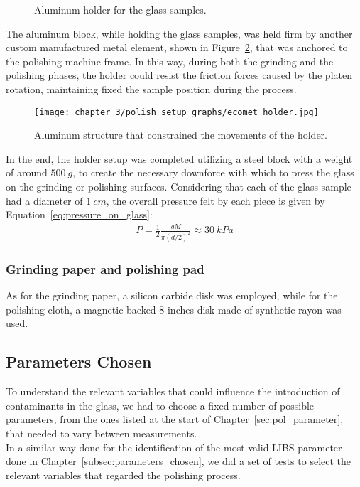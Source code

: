 \begin{figure}[H]
    \centering
    \quad
    \caption{Aluminum holder for the glass samples. }
    \label{fig:holder}
\end{figure}
The aluminum block, while holding the glass samples, was held firm by another custom manufactured metal element, shown in Figure~\ref{fig:aluminum_structure}, that was anchored to the polishing machine frame. In this way, during both the grinding and the polishing phases, the holder could resist the friction forces caused by the 
platen rotation, maintaining fixed the sample position during the process.
\begin{figure}[H]
    \centering
    \texttt{[image: chapter\_3/polish\_setup\_graphs/ecomet\_holder.jpg]} 
    \caption{Aluminum structure that constrained the movements of the holder.}
    \label{fig:aluminum_structure}
\end{figure}
In the end, the holder setup was completed utilizing a steel block with a weight of around $500\: g$, to create the necessary downforce with which to press the glass on the grinding or polishing surfaces. Considering that each of the glass sample had a diameter of $1\:cm$, the overall pressure felt by each piece is given by Equation~\ref{eq:pressure_on_glass}:
\begin{align}
    P=\frac{1}{2}\frac{gM}{\pi\left(d/2\right)^2}\approx30\ kPa \label{eq:pressure_on_glass}
\end{align}

\subsubsection{Grinding paper and polishing pad}
\label{subsubsec:grinding_paper_and_pad}
As for the grinding paper, a silicon carbide disk was employed, while for the polishing cloth, a magnetic backed 8 inches disk made of synthetic rayon was used.
\subsection{Parameters Chosen}
\label{subsec:parameters_chosen_polish}
To understand the relevant variables that could influence the introduction of contaminants in the glass, we had to choose a fixed number of possible parameters, from the ones listed at the start of Chapter~\ref{sec:pol_parameter}, that needed to vary between measurements.
\\
In a similar way done for the identification of the most valid LIBS parameter done in Chapter~\ref{subsec:parameters_chosen}, we did a set of tests to select the relevant variables that regarded the polishing process.


